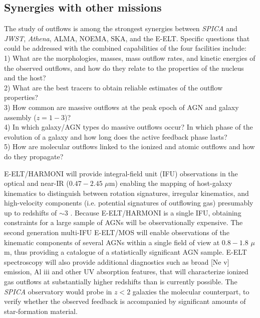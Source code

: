 \documentclass{pasa}%
\begin{document}
\subsection{Synergies with other missions}
\label{sec:synergies}


The study of outflows is among the strongest synergies between 
{\it SPICA} and {\it JWST}, {\it Athena}, ALMA, NOEMA, SKA, and
the E-ELT. Specific questions that could be addressed with the combined
capabilities of the four facilities  include: \\
1) What are the morphologies, masses, mass outflow rates, and kinetic 
energies of the observed outflows, and how do they relate to the
properties of the nucleus and the host? \\
2) What are the best tracers to obtain reliable estimates of the 
outflow properties? \\
3) How common are massive outflows at the peak epoch of AGN and 
galaxy assembly ($z = 1-3$)? \\
4) In which galaxy/AGN types do massive outflows occur? In 
which phase of the evolution of a galaxy and how long does the 
active feedback phase lasts? \\
5) How are molecular outflows linked to the ionized and atomic outflows and
how do they propagate?  



E-ELT/HARMONI will provide integral-field unit (IFU) observations in the
optical and near-IR ($0.47-2.45$ $\mu$m) enabling the mapping of host-galaxy
kinematics to distinguish between rotation signatures, irregular 
kinematics, and high-velocity components (i.e. potential 
signatures of outflowing gas) presumably up to redshifts of $\sim3$ 
\citep[e.g.][]{ken16}. Because E-ELT/HARMONI is a single IFU, 
obtaining constraints for a large sample of AGNs will 
be observationally expensive. The second generation multi-IFU 
E-ELT/MOS will enable observations of the kinematic components of 
several AGNs within a single field of view at $0.8-1.8$ $\mu$m, 
thus providing a catalogue of a statistically significant AGN 
sample. E-ELT spectroscopy will also provide additional diagnostics such 
as broad [Ne {\sc v}] emission, Al {\sc iii} and other UV absorption 
features, that will characterize ionized gas outflows at 
substantially higher redshifts than is currently possible.
The {\it SPICA} observatory would probe in $z<2$ galaxies 
the molecular counterpart, to verify whether the observed feedback is
accompanied by significant amounts of star-formation material. 
\end{document}
